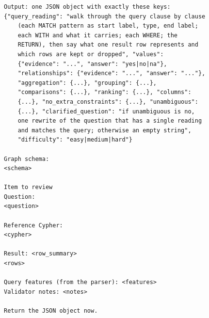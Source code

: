 \begin{verbatim}
Output: one JSON object with exactly these keys:
{"query_reading": "walk through the query clause by clause
    (each MATCH pattern as start label, type, end label;
    each WITH and what it carries; each WHERE; the
    RETURN), then say what one result row represents and
    which rows are kept or dropped", "values":
    {"evidence": "...", "answer": "yes|no|na"},
    "relationships": {"evidence": "...", "answer": "..."},
    "aggregation": {...}, "grouping": {...},
    "comparisons": {...}, "ranking": {...}, "columns":
    {...}, "no_extra_constraints": {...}, "unambiguous":
    {...}, "clarified_question": "if unambiguous is no,
    one rewrite of the question that has a single reading
    and matches the query; otherwise an empty string",
    "difficulty": "easy|medium|hard"}

Graph schema:
<schema>

Item to review
Question:
<question>

Reference Cypher:
<cypher>

Result: <row_summary>
<rows>

Query features (from the parser): <features>
Validator notes: <notes>

Return the JSON object now.
\end{verbatim}
\endgroup
